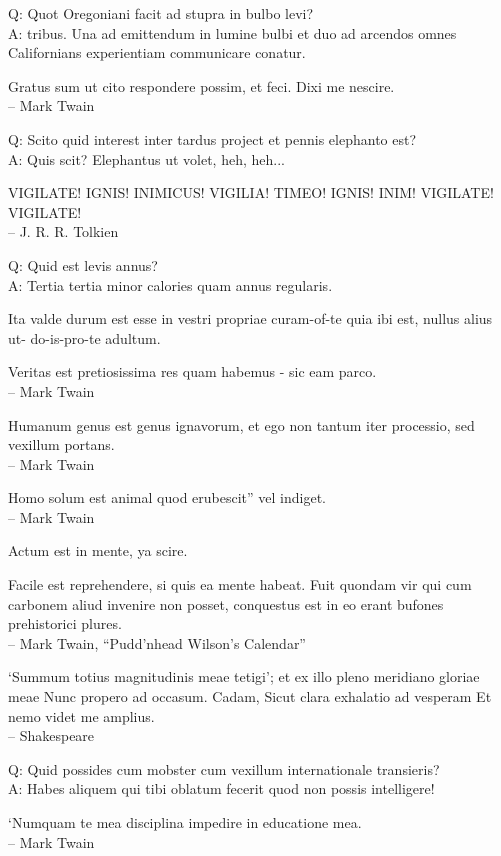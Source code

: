 \documentclass[titlepage,12pt]{memoir}
\begin{document}
Q: Quot Oregoniani facit ad stupra in bulbo levi?\\
A: tribus. Una ad emittendum in lumine bulbi et duo ad arcendos omnes
Californians experientiam communicare conatur.

 Gratus sum ut cito respondere possim, et feci. Dixi me nescire.
\\-- Mark Twain

Q: Scito quid interest inter tardus project
et pennis elephanto est?\\
A: Quis scit? Elephantus ut volet, heh, heh...

VIGILATE! IGNIS! INIMICUS! VIGILIA!
TIMEO! IGNIS! INIM!
VIGILATE! VIGILATE!
\\-- J. R. R. Tolkien

Q: Quid est levis annus?\\
A: Tertia tertia minor calories quam annus regularis.

Ita valde durum est esse
in vestri propriae curam-of-te quia ibi est, nullus alius ut- do-is-pro-te
adultum.

Veritas est pretiosissima res quam habemus - sic eam parco.
\\-- Mark Twain

Humanum genus est genus ignavorum, et ego non tantum iter
processio, sed vexillum portans.
\\-- Mark Twain

Homo solum est animal quod erubescit” vel indiget.
\\-- Mark Twain

Actum est in mente, ya scire.

Facile est reprehendere, si quis ea mente habeat. Fuit quondam vir
qui cum carbonem aliud invenire non posset, conquestus est
in eo erant bufones prehistorici plures.
\\-- Mark Twain, “Pudd’nhead Wilson’s Calendar”

‘Summum totius magnitudinis meae tetigi’;
et ex illo pleno meridiano gloriae meae
Nunc propero ad occasum. Cadam,
Sicut clara exhalatio ad vesperam
Et nemo videt me amplius.
\\-- Shakespeare

Q: Quid possides cum mobster cum vexillum internationale transieris?\\
A: Habes aliquem qui tibi oblatum fecerit quod non possis intelligere!

‘Numquam te mea disciplina impedire in educatione mea.
\\-- Mark Twain
\end{document}
